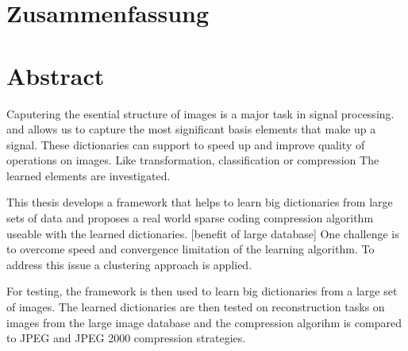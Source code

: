 \newpage
{}
{}
\chapter*{Zusammenfassung}
\thispagestyle{empty}

\newpage
{}
{}
\chapter*{Abstract}
\thispagestyle{empty}
Caputering the esential structure of images is a major task in signal
processing. and allows us to capture the most significant basis elements that
make up a signal. These dictionaries can support to speed up and improve quality
of operations on images. Like transformation, classification or compression
The learned elements are investigated.

This thesis develops a framework that helps to learn big dictionaries
from large sets of data and proposes a real world sparse coding compression
algorithm useable with the learned dictionaries. [benefit of large database] One
challenge is to overcome speed and convergence limitation of the learning
algorithm. To address this issue a clustering approach is applied. 

For testing, the framework is then used to learn big dictionaries from a large
set of images. The learned dictionaries are then tested on reconstruction
tasks on images from the large image database and the compression algorihm is
compared to JPEG and JPEG 2000 compression strategies.



